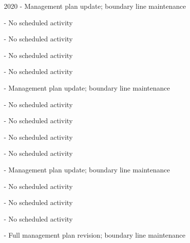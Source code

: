 \documentclass[]{tufte-handout}
\begin{document}
\small 2020 - Management plan update; boundary line maintenance

\vspace{5pt}

 - No scheduled activity

\vspace{5pt}

 - No scheduled activity

\vspace{5pt}

 - No scheduled activity

\vspace{5pt}

 - No scheduled activity

\vspace{5pt}

 - Management plan update; boundary line maintenance

\vspace{5pt}

 - No scheduled activity

\vspace{5pt}

 - No scheduled activity

\vspace{5pt}

 - No scheduled activity

\vspace{5pt}

 - No scheduled activity

\vspace{5pt}

 - Management plan update; boundary line maintenance

\vspace{5pt}

 - No scheduled activity

\vspace{5pt}

 - No scheduled activity

\vspace{5pt}

 - No scheduled activity

\vspace{5pt}

 - Full management plan revision; boundary line
maintenance
\end{document}
